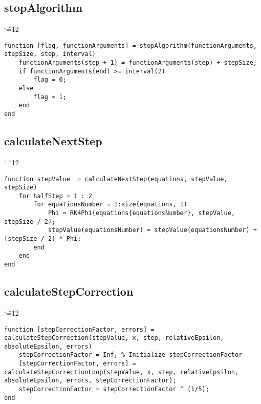 \documentclass[12pt]{report}
\newenvironment{simplechar}{%
   \catcode`\^=12
}{}
\begin{document}
\subsection{stopAlgorithm}
\begin{simplechar}
\begin{lstlisting}
function [flag, functionArguments] = stopAlgorithm(functionArguments, stepSize, step, interval)
    functionArguments(step + 1) = functionArguments(step) + stepSize;
    if functionArguments(end) >= interval(2)
        flag = 0;
    else
        flag = 1;
    end
end
\end{lstlisting}
\end{simplechar}

\subsection{calculateNextStep}
\begin{simplechar}
\begin{lstlisting}
function stepValue  = calculateNextStep(equations, stepValue, stepSize)
    for halfStep = 1 : 2
        for equationsNumber = 1:size(equations, 1)
            Phi = RK4Phi(equations{equationsNumber}, stepValue, stepSize / 2);
            stepValue(equationsNumber) = stepValue(equationsNumber) + (stepSize / 2) * Phi;
        end
    end
end

\end{lstlisting}
\end{simplechar}

\subsection{calculateStepCorrection}
\begin{simplechar}
\begin{lstlisting}
function [stepCorrectionFactor, errors] = calculateStepCorrection(stepValue, x, step, relativeEpsilon, absoluteEpsilon, errors)
    stepCorrectionFactor = Inf; % Initialize stepCorrectionFactor
    [stepCorrectionFactor, errors] = calculateStepCorrectionLoop(stepValue, x, step, relativeEpsilon, absoluteEpsilon, errors, stepCorrectionFactor);
    stepCorrectionFactor = stepCorrectionFactor ^ (1/5);
end
\end{lstlisting}
\end{simplechar}
\end{document}
